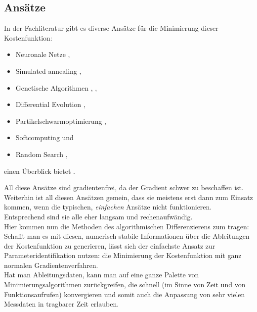 \documentclass{scrartcl}
\begin{document}
\subsection{Ansätze}
In der Fachliteratur gibt es diverse Ansätze für die Minimierung dieser Kostenfunktion:
\begin{itemize}
	\item Neuronale Netze \cite{neural},
	\item Simulated annealing \cite{annealing},
	\item Genetische Algorithmen \cite{genetic}, \cite{genetic2},
	\item Differential Evolution \cite{de},
	\item Partikelschwarmoptimierung \cite{particle_swarm},
	\item Softcomputing \cite{softcomputing} und
	\item Random Search \cite{random},
\end{itemize}
einen Überblick bietet \cite{vergleich}.\par
All diese Ansätze sind gradientenfrei, da der Gradient schwer zu beschaffen ist. Weiterhin ist all diesen Ansätzen gemein, dass sie meistens erst dann zum Einsatz kommen, wenn die typischen, \emph{einfachen} Ansätze nicht funktionieren. Entsprechend sind sie alle eher langsam und rechenaufwändig.\\
Hier kommen nun die Methoden des algorithmischen Differenzierens zum tragen: Schafft man es mit diesen, numerisch stabile Informationen über die Ableitungen der Kostenfunktion zu generieren, lässt sich der einfachste Ansatz zur Parameteridentifikation nutzen: die Minimierung der Kostenfunktion mit ganz normalen Gradientenverfahren.\\
Hat man Ableitungsdaten, kann man auf eine ganze Palette von Minimierungsalgorithmen zurückgreifen, die schnell (im Sinne von Zeit und von Funktionsaufrufen) konvergieren und somit auch die Anpassung von sehr vielen Messdaten in tragbarer Zeit erlauben.
\end{document}
